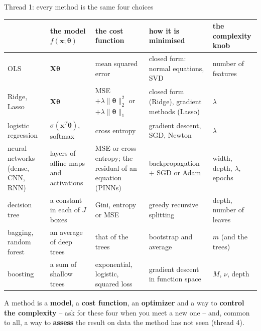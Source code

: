 \documentclass[10pt,aspectratio=169]{beamer}
\begin{document}
\begin{frame}{Thread 1: every method is the same four choices}
\centering
\scriptsize
\setlength{\tabcolsep}{4pt}
\begin{tabular}{@{}L{2.3cm}L{2.5cm}L{3.0cm}L{2.9cm}L{2.2cm}@{}}
\toprule
 & the model $f(\bm{x};\bm{\theta})$ & the cost function & how it is minimised & the complexity knob\\
\midrule
OLS & $\bm{X}\bm{\theta}$ & mean squared error & closed form: normal equations, SVD & number of features\\
\addlinespace[1.5pt]
Ridge, Lasso & $\bm{X}\bm{\theta}$ & MSE $+\lambda\|\bm{\theta}\|_2^2$ or $+\lambda\|\bm{\theta}\|_1$ &
  closed form (Ridge), gradient methods (Lasso) & $\lambda$\\
\addlinespace[1.5pt]
logistic regression & $\sigma(\bm{x}^T\bm{\theta})$, softmax & cross entropy & gradient descent, SGD, Newton & $\lambda$\\
\addlinespace[1.5pt]
neural networks (dense, CNN, RNN) & layers of affine maps and activations & MSE or cross entropy;
  the residual of an equation (PINNs) & backpropagation $+$ SGD or Adam & width, depth, $\lambda$, epochs\\
\addlinespace[1.5pt]
decision tree & a constant in each of $J$ boxes & Gini, entropy or MSE & greedy recursive splitting & depth, number of leaves\\
\addlinespace[1.5pt]
bagging, random forest & an average of deep trees & that of the trees & bootstrap and average & $m$ (and the trees)\\
\addlinespace[1.5pt]
boosting & a sum of shallow trees & exponential, logistic, squared loss & gradient descent in function space & $M$, $\nu$, depth\\
\bottomrule
\end{tabular}

\medskip
\footnotesize
A method is a \textbf{model}, a \textbf{cost function}, an \textbf{optimizer}
and a way to \textbf{control the complexity} -- ask for these four when you
meet a new one -- and, common to all, a way to \textbf{assess} the result on
data the method has not seen (thread 4).
\end{frame}
\end{document}
